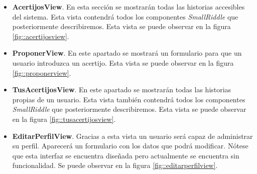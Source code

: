 \begin{itemize}
    \item \textbf{AcertijosView}. En esta sección se mostrarán todas las historias accesibles del sistema. Esta vista contendrá todos los componentes \textit{SmallRiddle} que posteriormente describiremos. Esta vista se puede observar en la figura \ref{fig::acertijosview}.
    \item \textbf{ProponerView}. En este apartado se mostrará un formulario para que un usuario introduzca un acertijo. Esta vista se puede observar en la figura \ref{fig::proponerview}.
    \item \textbf{TusAcertijosView}. En este apartado se mostrarán todas las historias propias de un usuario. Esta vista también contendrá todos los componentes \textit{SmallRiddle} que posteriormente describiremos. Esta vista se puede observar en la figura \ref{fig::tusacertijosview}.
    \item \textbf{EditarPerfilView}. Gracias a esta vista un usuario será capaz de administrar su perfil. Aparecerá un formulario con los datos que podrá modificar. Nótese que esta interfaz se encuentra diseñada pero actualmente se encuentra sin funcionalidad. Se puede observar en la figura \ref{fig::editarperfilview}.
\end{itemize}

